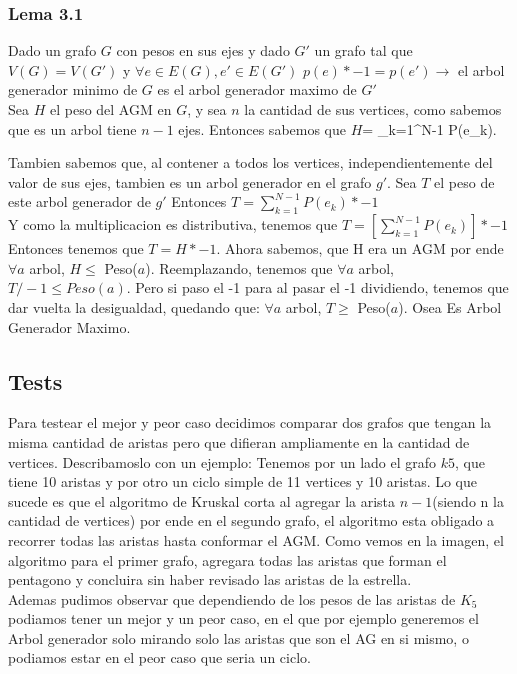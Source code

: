     \subsubsection{Lema 3.1}
    Dado un grafo $G$ con pesos en sus ejes y dado $G'$ un grafo tal que $V(G) = V(G')$ y $\forall e \in E(G), e' \in E(G')$ $p(e) * -1 = p(e') \rightarrow$ el arbol generador minimo de $G$ es el arbol generador maximo de $G'$ \\
    
    Sea $H$ el peso del AGM en $G$, y sea $n$ la cantidad de sus vertices, como sabemos que es un arbol tiene $n -1$ ejes. Entonces sabemos que $H$= \displaystyle\sum_{k=1}^{N-1}   P(e_k).\\ \endl
           
    Tambien sabemos que, al contener a todos los vertices, independientemente del valor de sus ejes, tambien es un arbol generador en el grafo $g'$. Sea $T$ el peso de este arbol generador de $g'$
    Entonces $T =  \displaystyle\sum_{k=1}^{N-1}  P(e_k)*-1 $\\ \endl
    Y como la multiplicacion es distributiva, tenemos que $T =[  \displaystyle\sum_{k=1}^{N-1}  P(e_k) ]*-1$ \\
    Entonces tenemos que $T = H * -1$. Ahora sabemos, que H era un AGM por ende $\forall a$ arbol, $H \le$ Peso($a$). Reemplazando, tenemos que $\forall a$ arbol, $T/-1 \le Peso(a)$. Pero si paso el -1 para al pasar el -1 dividiendo, tenemos que dar vuelta la desigualdad, quedando que:
    $\forall a$ arbol, $T \ge$ Peso($a$). Osea Es Arbol Generador Maximo.
    
\subsection{Tests}
    Para testear el mejor y peor caso decidimos comparar dos grafos que tengan la misma cantidad de aristas pero que difieran ampliamente en la cantidad de vertices. Describamoslo con un ejemplo: Tenemos por un lado el grafo $k5$, que tiene 10 aristas y por otro un ciclo simple de 11 vertices y 10 aristas. Lo que sucede es que el algoritmo de Kruskal corta al agregar la arista $n-1$(siendo n la cantidad de vertices) por ende en el segundo grafo, el algoritmo esta obligado a recorrer todas las aristas hasta conformar el AGM. Como vemos en la imagen, el algoritmo para el primer grafo, agregara todas las aristas que forman el pentagono y concluira sin haber revisado las aristas de la estrella.\\
    Ademas pudimos observar que dependiendo de los pesos de las aristas de $K_5$ podiamos tener un mejor y un peor caso, en el que por ejemplo generemos el Arbol generador solo mirando solo las aristas que son el AG en si mismo, o podiamos estar en el peor caso que seria un ciclo.\\ \\ 
    \\ \\ \\ \\ \\ 
    
